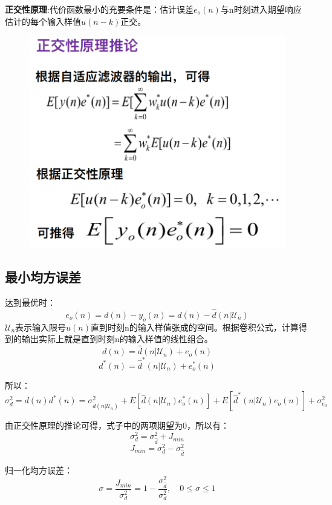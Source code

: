 \documentclass[UTF8]{ctexart} %
\begin{document}
			\textbf{正交性原理}:代价函数最小的充要条件是：估计误差$e_o(n)$与n时刻进入期望响应估计的每个输入样值$u(n-k)$正交。
			\begin{figure}[H]
				\centering\includegraphics[scale=0.3]{11.png}
			\end{figure}
		\subsection{最小均方误差}
			达到最优时：
			\[e_o(n) = d(n) - y_o(n) = d(n) - \hat{d}(n|\mathcal{U}_n)\]
			$\mathcal{U}_n$表示输入限号$u(n)$直到时刻n的输入样值张成的空间。根据卷积公式，计算得到的输出实际上就是直到时刻n的输入样值的线性组合。
			\[d(n) = \hat{d}(n|\mathcal{U}_n) +e_o(n)\]	
			\[d^*(n) = \hat{d}^*(n|\mathcal{U}_n) +e_o^*(n)\]	
			
			所以：
			\[\sigma_d^2 = d(n)d^*(n) = \sigma_{\hat{d}(n|\mathcal{U}_n)}^2 + E[\hat{d}(n|\mathcal{U}_n)e_o^*(n)]+ E[\hat{d}^*(n|\mathcal{U}_n)e_o(n)]+ \sigma_{e_0}^2\]
			
			由正交性原理的推论可得，式子中的两项期望为0，所以有：
			\[\sigma_d^2 = \sigma_{\hat{d}}^2 + J_{min}\]
			\[ J_{min} = \sigma_d^2 - \sigma_{\hat{d}}^2\]
			
			归一化均方误差：
			\[\sigma = \frac{J_{min}}{\sigma_d^2} = 1-\frac{\sigma_{\hat{d}}^2}{\sigma_d^2}, \quad 0\leq \sigma\leq1\]
\end{document}
